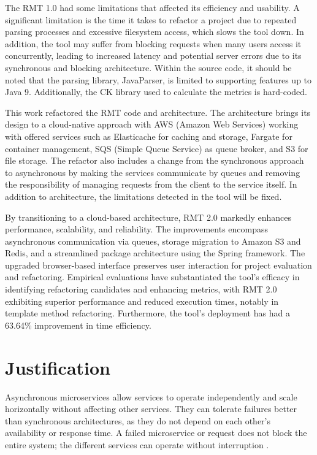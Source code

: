 The RMT 1.0 had some limitations that affected its efficiency and usability. A significant limitation is the time it takes to refactor a project due to repeated parsing processes and excessive filesystem access, which slows the tool down. In addition, the tool may suffer from blocking requests when many users access it concurrently, leading to increased latency and potential server errors due to its synchronous and blocking architecture. Within the source code, it should be noted that the parsing library, JavaParser, is limited to supporting features up to Java 9. Additionally, the CK library used to calculate the metrics is hard-coded.

This work refactored the RMT code and architecture. The architecture brings its design to a cloud-native approach with AWS (Amazon Web Services) working with offered services such as Elasticache for caching and storage, Fargate for container management, SQS (Simple Queue Service) as queue broker, and S3 for file storage. The refactor also includes a change from the synchronous approach to asynchronous by making the services communicate by queues and removing the responsibility of managing requests from the client to the service itself. In addition to architecture, the limitations detected in the tool will be fixed.

By transitioning to a cloud-based architecture, RMT 2.0 markedly enhances performance, scalability, and reliability. The improvements encompass asynchronous communication via queues, storage migration to Amazon S3 and Redis, and a streamlined package architecture using the Spring framework. The upgraded browser-based interface preserves user interaction for project evaluation and refactoring. Empirical evaluations have substantiated the tool's efficacy in identifying refactoring candidates and enhancing metrics, with RMT 2.0 exhibiting superior performance and reduced execution times, notably in template method refactoring. Furthermore, the tool's deployment has had a 63.64\% improvement in time efficiency.


\section{Justification}
Asynchronous microservices allow services to operate independently and scale horizontally without affecting other services. They can tolerate failures better than synchronous architectures, as they do not depend on each other's availability or response time. A failed microservice or request does not block the entire system; the different services can operate without interruption \cite{microservices-comuni}.

